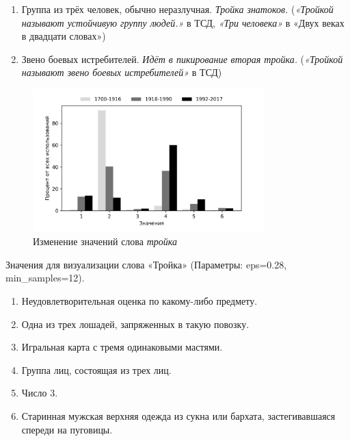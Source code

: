 \documentclass[LI,VKR]{HSEUniversity}
\begin{document}
\begin{enumerate}
    \item Группа из трёх человек, обычно неразлучная. \textit{Тройка знатоков.}
    (\textit{«Тройкой называют устойчивую группу людей.»} в ТСД,
    \textit{«Три человека»} в «Двух веках в двадцати словах»)

    \item Звено боевых истребителей. \textit{Идёт в пикирование вторая тройка.}
    (\textit{«Тройкой называют звено боевых истребителей»} в ТСД)
\end{enumerate}

%

\begin{figure}[H]
	\centering
	\includegraphics[width=0.8\textwidth]{img/visualizations/trojka_minimal}
	\caption{Изменение значений слова \textit{тройка}}
	\label{fig:Тройка}
\end{figure}

Значения для визуализации слова «Тройка» (Параметры: eps=0.28, min\_samples=12).

\begin{enumerate}
    \item Неудовлетворительная оценка по какому-либо предмету.
    \item Одна из трех лошадей, запряженных в такую повозку.
    \item Игральная карта с тремя одинаковыми мастями.
    \item Группа лиц, состоящая из трех лиц.
    \item Число 3.
    \item Старинная мужская верхняя одежда из сукна или бархата, застегивавшаяся спереди на пуговицы.
\end{enumerate}
\end{document}
